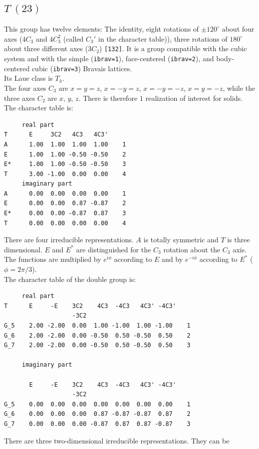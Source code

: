 \documentclass[12pt,a4paper]{article}
\begin{document}
\newpage
\subsection{\color{web-blue}$T\ (23)$} 
This group has twelve elements: The identity, eight rotations of $\pm120^\circ$ 
about four axes ($4C_3$ and $4C_3^2$ (called $C_3'$ in the character
table)), three rotations of $180^\circ$ about three different axes ($3C_2$)
\texttt{[132]}.
It is a group compatible with the cubic system and with the  
simple (\texttt{ibrav=1}), face-centered (\texttt{ibrav=2}), 
and body-centered cubic (\texttt{ibrav=3}) Bravais lattices. \\
Its Laue class is $T_{h}$. \\
The four axes $C_3$ are $x=y=z$, $x=-y=z$, $x=-y=-z$, $x=y=-z$, while
the three axes $C_2$ are $x$, $y$, $z$. There is therefore $1$
realization of interest for solids. \\
The character table is:
\begin{verbatim}
     real part
T      E     3C2   4C3   4C3' 
A      1.00  1.00  1.00  1.00    1
E      1.00  1.00 -0.50 -0.50    2
E*     1.00  1.00 -0.50 -0.50    3
T      3.00 -1.00  0.00  0.00    4
     imaginary part
A      0.00  0.00  0.00  0.00    1
E      0.00  0.00  0.87 -0.87    2
E*     0.00  0.00 -0.87  0.87    3
T      0.00  0.00  0.00  0.00    4
\end{verbatim}
There are four irreducible representations. $A$ is totally symmetric and
$T$ is three dimensional. $E$ and $E^*$ are distinguished for the $C_3$ rotation
about the $C_3$ axis. The functions are multiplied by $e^{i\phi}$ according
to $E$ and by $e^{-i\phi}$ according to $E^*$ ($\phi=2\pi/3$). \\
The character table of the double group is:
\begin{verbatim}
     real part
T      E     -E    3C2    4C3  -4C3   4C3' -4C3'
                   -3C2                         
G_5    2.00 -2.00  0.00  1.00 -1.00  1.00 -1.00    1
G_6    2.00 -2.00  0.00 -0.50  0.50 -0.50  0.50    2
G_7    2.00 -2.00  0.00 -0.50  0.50 -0.50  0.50    3

     imaginary part

       E     -E    3C2    4C3  -4C3   4C3' -4C3'
                   -3C2                         
G_5    0.00  0.00  0.00  0.00  0.00  0.00  0.00    1
G_6    0.00  0.00  0.00  0.87 -0.87 -0.87  0.87    2
G_7    0.00  0.00  0.00 -0.87  0.87  0.87 -0.87    3
\end{verbatim}
There are three two-dimensional irreducible representations. They can be
\end{document}
